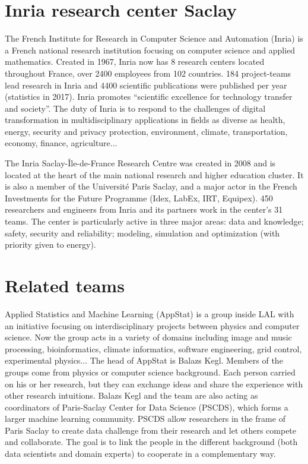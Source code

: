 \section{Inria research center Saclay}
The French Institute for Research in Computer Science and Automation (Inria) is a French national research institution focusing on computer science and applied mathematics. Created in 1967, Inria now has 8 research centers located throughout France, over 2400 employees from 102 countries. 184 project-teams lead research in Inria and 4400 scientific publications were published per year (statistics in 2017)\cite{inria_statistics}. Inria promotes “scientific excellence for technology transfer and society”. The duty of Inria is to respond to the challenges of digital transformation in multidisciplinary applications in fields as diverse as health, energy, security and privacy protection, environment, climate, transportation, economy, finance, agriculture...

The Inria Saclay-Île-de-France Research Centre was created in 2008 and is located at the heart of the main national research and higher education cluster. It is also a member of the Université Paris Saclay, and a major actor in the French Investments for the Future Programme (Idex, LabEx, IRT, Equipex). 450 researchers and engineers from Inria and its partners work in the center's 31 teams. The center is particularly active in three major areas: data and knowledge; safety, security and reliability; modeling, simulation and optimization (with priority given to energy)\cite{inria_overview}.

\section{Related teams}
\label{teams}
Applied Statistics and Machine Learning (AppStat) is a group inside LAL with an initiative focusing on interdisciplinary projects between physics and computer science. Now the group acts in a variety of domains including image and music processing, bioinformatics, climate informatics, software engineering, grid control, experimental physics... The head of AppStat is Balazs Kegl. Members of the groups come from physics or computer science background. Each person carried on his or her research, but they can exchange ideas and share the experience with other research intuitions. Balazs Kegl and the team are also acting as coordinators of Paris-Saclay Center for Data Science (PSCDS), which forms a larger machine learning community. PSCDS allow researchers in the frame of Paris Saclay to create data challenge from their research and let others compete and collaborate. The goal is to link the people in the different background (both data scientists and domain experts) to cooperate in a complementary way\cite{balazs-kegl}.  

